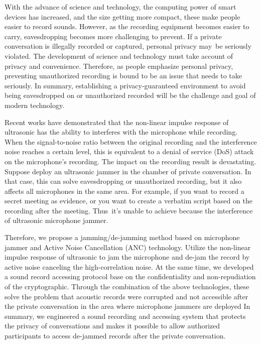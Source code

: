 \begin{abstract*}

    With the advance of science and technology,
the computing power of smart devices has increased,
and the size getting more compact,
these make people easier to record sounds.
However, as the recording equipment becomes easier to carry,
eavesdropping becomes more challenging to prevent.
If a private conversation is illegally recorded or captured,
personal privacy may be seriously violated.
The development of science and technology must take account of privacy and convenience.
Therefore, as people emphasize personal privacy,
preventing unauthorized recording is bound to be an issue that needs to take seriously.
In summary, establishing a privacy-guaranteed environment
to avoid being eavesdropped on or unauthorized recorded
will be the challenge and goal of modern technology.

    Recent works have demonstrated that the non-linear impulse response of ultrasonic
has the ability to interferes with the microphone while recording.
When the signal-to-noise ratio between the original recording
and the interference noise reaches a certain level,
this is equivalent to a denial of service (DoS) attack on the microphone's recording. The impact on the recording result is devastating.
Suppose deploy an ultrasonic jammer in the chamber of private conversation. In that case,
this can solve eavesdropping or unauthorized recording,
but it also affects all microphones in the same area. For example,
if you want to record a secret meeting as evidence,
or you want to create a verbatim script based on the recording after the meeting.
Thus it's unable to achieve because the interference of ultrasonic microphone jammer.

    Therefore, we propose a jamming/de-jamming method
based on microphone jammer and Active Noise Cancellation (ANC) technology.
Utilize the non-linear impulse response of ultrasonic to jam the microphone
and de-jam the record by active noise canceling the high-correlation noise.
At the same time, we developed a sound record accessing protocol
base on the confidentiality and non-repudiation of the cryptographic.
Through the combination of the above technologies,
these solve the problem that acoustic records were corrupted and not accessible
after the private conversation in the area where microphone jammers are deployed
In summary, we engineered a sound recording and accessing system
that protects the privacy of conversations and makes it possible to allow authorized participants
to access de-jammed records after the private conversation.

\end{abstract*}
